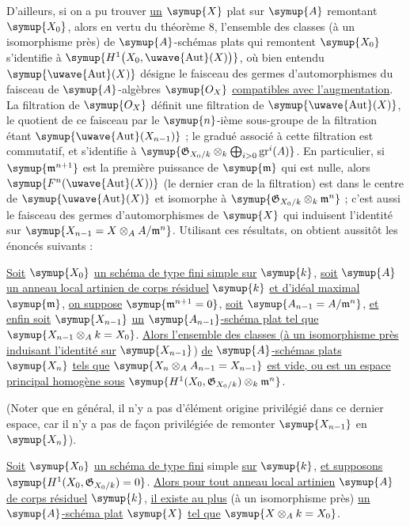D'ailleurs, si on a pu trouver \uline{un} $\symup{X}$ plat sur $\symup{A}$ remontant $\symup{X_0}$, alors en
vertu du théorème 8, l'ensemble des classes (à un isomorphisme près) de
$\symup{A}$-schémas plats qui remontent $\symup{X_0}$ s'identifie à
$\symup{H^1\bigl(X_0,\mathop{\text{\uwave{Aut}}}\nolimits(X)\bigr)}$,
où bien entendu $\symup{\mathop{\text{\uwave{Aut}}}\nolimits(X)}$ désigne le faisceau des
germes d'automorphismes du faisceau de $\symup{A}$-algèbres $\symup{O_X}$ \uline{compatibles avec l'augmentation}. La filtration de $\symup{O_X}$ définit une filtration de
$\symup{\mathop{\text{\uwave{Aut}}}\nolimits(X)}$, le quotient de ce faisceau par le
$\symup{n}$-ième sous-groupe de la filtration étant
$\symup{\mathop{\text{\uwave{Aut}}}\nolimits(X_{n-1})}$ ; le gradué associé à cette filtration
est commutatif, et s'identifie à
$\symup{\mathfrak G_{X_0/k}\otimes_k\bigoplus_{i>0}\operatorname{gr}^i(A)}$. En particulier, si
$\symup{\mathfrak m^{n+1}}$ est la première puissance de $\symup{\mathfrak m}$ qui est nulle,
alors $\symup{F^n(\mathop{\text{\uwave{Aut}}}\nolimits(X))}$ (le dernier cran de la
filtration) est dans le centre de $\symup{\mathop{\text{\uwave{Aut}}}\nolimits(X)}$ et
isomorphe à $\symup{\mathfrak G_{X_0/k}\otimes_k\mathfrak m^n}$ ; c'est aussi le faisceau
des germes d'automorphismes de $\symup{X}$ qui induisent l'identité sur
$\symup{X_{n-1}=X\otimes_A A/\mathfrak m^n}$. Utilisant ces résultats, on obtient
aussitôt les énoncés suivants :

 \uline{Soit} $\symup{X_0}$ \uline{un schéma de type fini simple sur} $\symup{k}$, \uline{soit}
$\symup{A}$ \uline{un anneau local artinien de corps résiduel} $\symup{k}$ \uline{et d'idéal maximal}
$\symup{\mathfrak m}$, \uline{on suppose} $\symup{\mathfrak m^{n+1}=0}$, \uline{soit}
$\symup{A_{n-1}=A/\mathfrak m^n}$, \uline{et enfin soit} $\symup{X_{n-1}}$ \uline{un} $\symup{A_{n-1}}$\uline{-schéma plat
tel que} $\symup{X_{n-1}\otimes_A k=X_0}$. \uline{Alors l'ensemble des classes (à un
isomorphisme près induisant l'identité sur} $\symup{X_{n-1}}$) \uline{de} $\symup{A}$\uline{-schémas plats}
$\symup{X_n}$ \uline{tels que} $\symup{X_n\otimes_A A_{n-1}=X_{n-1}}$ \uline{est vide, ou est un espace
principal homogène sous}
$\symup{H^1(X_0,\mathfrak G_{X_0/k})\otimes_k\mathfrak m^n}$.

(Noter que en général, il n'y a pas d'élément origine privilégié dans ce
dernier espace, car il n'y a pas de façon privilégiée de remonter $\symup{X_{n-1}}$ en
$\symup{X_n}$).

 \uline{Soit} $\symup{X_0}$ \uline{un schéma de type fini} simple \uline{sur} $\symup{k}$, \uline{et
supposons} $\symup{H^1(X_0,\mathfrak G_{X_0/k})=0}$. \uline{Alors pour tout anneau local artinien}
$\symup{A}$ \uline{de corps résiduel} $\symup{k}$, \uline{il existe au plus} (à un isomorphisme près) \uline{un}
$\symup{A}$\uline{-schéma plat} $\symup{X}$ \uline{tel que} $\symup{X\otimes_A k=X_0}$.

